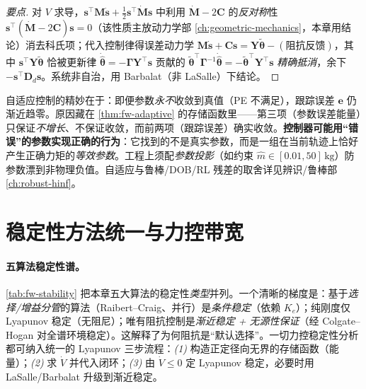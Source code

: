 \begin{proof}[要点]
对 $V$ 求导，$\mathbf{s}^\top\mathbf{M}\dot{\mathbf{s}}+\tfrac12\mathbf{s}^\top\dot{\mathbf{M}}\mathbf{s}$ 中利用 $\dot{\mathbf{M}}-2\mathbf{C}$ 的\emph{反对称}性 $\mathbf{s}^\top(\dot{\mathbf{M}}-2\mathbf{C})\mathbf{s}=0$（该性质主放动力学部 \cref{ch:geometric-mechanics}，本章用结论）消去科氏项；代入控制律得误差动力学 $\mathbf{M}\dot{\mathbf{s}}+\mathbf{C}\mathbf{s}=\mathbf{Y}\tilde{\boldsymbol{\theta}}-(\text{阻抗反馈})$，其中 $\mathbf{s}^\top\mathbf{Y}\tilde{\boldsymbol{\theta}}$ 恰被更新律 $\dot{\hat{\boldsymbol{\theta}}}=-\boldsymbol{\Gamma}\mathbf{Y}^\top\mathbf{s}$ 贡献的 $\tilde{\boldsymbol{\theta}}^\top\boldsymbol{\Gamma}^{-1}\dot{\hat{\boldsymbol{\theta}}}=-\tilde{\boldsymbol{\theta}}^\top\mathbf{Y}^\top\mathbf{s}$ \emph{精确抵消}，余下 $-\mathbf{s}^\top\mathbf{D}_d\mathbf{s}$。系统非自治，用 Barbalat（非 LaSalle）下结论。
\end{proof}

\begin{insight}
\label{ins:fw-pe}
自适应控制的精妙在于：即便参数\emph{永不}收敛到真值（PE 不满足），跟踪误差 $\mathbf{e}$ 仍渐近趋零。原因藏在 \cref{thm:fw-adaptive} 的存储函数里——第三项（参数误差能量）只保证\emph{不增长}、不保证收敛，而前两项（跟踪误差）确实收敛。\textbf{控制器可能用“错误”的参数实现正确的行为}：它找到的不是真实参数，而是一组在当前轨迹上恰好产生正确力矩的\emph{等效参数}。工程上须配\emph{参数投影}（如约束 $\hat m\in[0.01,50]\,\mathrm{kg}$）防参数漂到非物理负值。自适应与鲁棒/DOB/RL 残差的取舍详见辨识/鲁棒部 \cref{ch:robust-hinf}。
\end{insight}

\section{稳定性方法统一与力控带宽}
\label{sec:fw-stability-bw}

\paragraph{五算法稳定性谱。}
\cref{tab:fw-stability} 把本章五大算法的稳定性\emph{类型}并列。一个清晰的梯度是：基于\emph{选择/增益分管}的算法（Raibert--Craig、并行）是\emph{条件稳定}（依赖 $K_e$）；纯刚度仅 Lyapunov 稳定（无阻尼）；唯有阻抗控制是\emph{渐近稳定 + 无源性保证}（经 Colgate--Hogan 对全谱环境稳定）。这解释了为何阻抗是“默认选择”。一切力控稳定性分析都可纳入统一的 Lyapunov 三步流程：\emph{(1)} 构造正定径向无界的存储函数（能量）；\emph{(2)} 求 $\dot V$ 并代入闭环；\emph{(3)} 由 $\dot V\le0$ 定 Lyapunov 稳定，必要时用 LaSalle/Barbalat 升级到渐近稳定。

